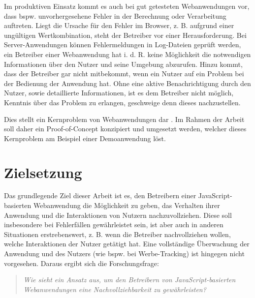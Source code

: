 Im produktiven Einsatz kommt es auch bei gut getesteten Webanwendungen vor, dass bspw. unvorhergesehene Fehler in der Berechnung oder Verarbeitung auftreten. Liegt die Ursache für den Fehler im Browser, z. B. aufgrund einer ungültigen Wertkombination, steht der Betreiber vor einer Herausforderung. Bei Server-Anwendungen können Fehlermeldungen in Log-Dateien geprüft werden, ein Betreiber einer Webanwendung hat i. d. R. keine Möglichkeit die notwendigen Informationen über den Nutzer und seine Umgebung abzurufen. Hinzu kommt, dass der Betreiber gar nicht mitbekommt, wenn ein Nutzer auf ein Problem bei der Bedienung der Anwendung hat. Ohne eine aktive Benachrichtigung durch den Nutzer, sowie detaillierte Informationen, ist es dem Betreiber nicht möglich, Kenntnis über das Problem zu erlangen, geschweige denn dieses nachzustellen.

Dies stellt ein Kernproblem von Webanwendungen dar \cite{ClientSideMonitoringOfDistributedSystems}. Im Rahmen der Arbeit soll daher ein Proof-of-Concept konzipiert und umgesetzt werden, welcher dieses Kernproblem am Beispiel einer Demoanwendung löst.

\section{Zielsetzung}

Das grundlegende Ziel dieser Arbeit ist es, den Betreibern einer JavaScript-basierten Webanwendung die Möglichkeit zu geben, das Verhalten ihrer Anwendung und die Interaktionen von Nutzern nachzuvollziehen. Diese soll insbesondere bei Fehlerfällen gewährleistet sein, ist aber auch in anderen Situationen erstrebenswert, z. B. wenn die Betreiber nachvollziehen wollen, welche Interaktionen der Nutzer getätigt hat. Eine vollständige Überwachung der Anwendung und des Nutzers (wie bspw. bei Werbe-Tracking) ist hingegen nicht vorgesehen. Daraus ergibt sich die Forschungsfrage:

\begin{quotation}
	\textit{Wie sieht ein Ansatz aus, um den Betreibern von JavaScript-basierten Webanwendungen eine Nachvollziehbarkeit zu gewährleisten?}
\end{quotation}

